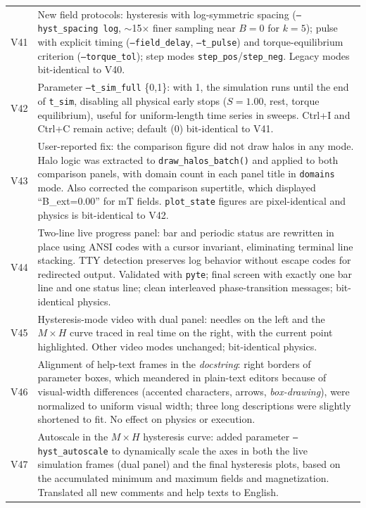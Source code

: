 \documentclass[11pt,a4paper]{article}
\newcommand{\code}[1]{\texttt{#1}}
\begin{document}
\begin{longtable}{@{}lp{11.5cm}@{}}
V41 & New field protocols: hysteresis with log-symmetric spacing (\code{--hyst\_spacing log}, $\sim$15$\times$ finer sampling near $B{=}0$ for $k{=}5$); pulse with explicit timing (\code{--field\_delay}, \code{--t\_pulse}) and torque-equilibrium criterion (\code{--torque\_tol}); step modes \code{step\_pos}/\code{step\_neg}. Legacy modes bit-identical to V40. \\
V42 & Parameter \code{--t\_sim\_full} \{0,1\}: with 1, the simulation runs until the end of \code{t\_sim}, disabling all physical early stops ($S{=}1.00$, rest, torque equilibrium), useful for uniform-length time series in sweeps. Ctrl+I and Ctrl+C remain active; default (0) bit-identical to V41. \\
V43 & User-reported fix: the comparison figure did not draw halos in any mode. Halo logic was extracted to \code{draw\_halos\_batch()} and applied to both comparison panels, with domain count in each panel title in \code{domains} mode. Also corrected the comparison supertitle, which displayed ``B\_ext=0.00'' for mT fields. \code{plot\_state} figures are pixel-identical and physics is bit-identical to V42. \\
V44 & Two-line live progress panel: bar and periodic status are rewritten in place using ANSI codes with a cursor invariant, eliminating terminal line stacking. TTY detection preserves log behavior without escape codes for redirected output. Validated with \code{pyte}; final screen with exactly one bar line and one status line; clean interleaved phase-transition messages; bit-identical physics. \\
V45 & Hysteresis-mode video with dual panel: needles on the left and the $M\times H$ curve traced in real time on the right, with the current point highlighted. Other video modes unchanged; bit-identical physics. \\
V46 & Alignment of help-text frames in the \emph{docstring}: right borders of parameter boxes, which meandered in plain-text editors because of visual-width differences (accented characters, arrows, \emph{box-drawing}), were normalized to uniform visual width; three long descriptions were slightly shortened to fit. No effect on physics or execution. \\
V47 & Autoscale in the $M\times H$ hysteresis curve: added parameter \code{--hyst\_autoscale} to dynamically scale the axes in both the live simulation frames (dual panel) and the final hysteresis plots, based on the accumulated minimum and maximum fields and magnetization. Translated all new comments and help texts to English. \\

\end{longtable}
\end{document}
